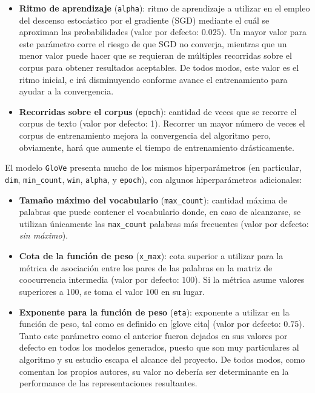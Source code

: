 \begin{itemize}
\item \textbf{Ritmo de aprendizaje} (\texttt{alpha}): ritmo de aprendizaje a utilizar en el empleo
del descenso estocástico por el gradiente (SGD) mediante el cuál se aproximan las probabilidades
(valor por defecto: $0.025$). Un mayor valor para este parámetro corre el riesgo de que SGD no
converja, mientras que un menor valor puede hacer que se requieran de múltiples recorridas sobre el
corpus para obtener resultados aceptables. De todos modos, este valor es el ritmo inicial, e irá
disminuyendo conforme avance el entrenamiento para ayudar a la convergencia.

\item \textbf{Recorridas sobre el corpus} (\texttt{epoch}): cantidad de veces que se recorre el
corpus de texto (valor por defecto: 1). Recorrer un mayor número de veces el corpus de entrenamiento
mejora la convergencia del algoritmo pero, obviamente, hará que aumente el tiempo de entrenamiento
drásticamente.

\end{itemize}

El modelo \texttt{GloVe} presenta mucho de los mismos hiperparámetros (en particular, \texttt{dim},
\texttt{min\_count}, \texttt{win}, \texttt{alpha}, y \texttt{epoch}), con algunos hiperparámetros
adicionales:

\begin{itemize}

\item \textbf{Tamaño máximo del vocabulario} (\texttt{max\_count}): cantidad máxima de palabras que
puede contener el vocabulario donde, en caso de alcanzarse, se utilizan únicamente las
\texttt{max\_count} palabras más frecuentes (valor por defecto: \textit{sin máximo}).

\item \textbf{Cota de la función de peso} (\texttt{x\_max}): cota superior a utilizar para la
métrica de asociación entre los pares de las palabras en la matriz de coocurrencia intermedia (valor
por defecto: $100$). Si la métrica asume valores superiores a $100$, se toma el valor $100$ en su
lugar.

\item \textbf{Exponente para la función de peso} (\texttt{eta}): exponente a utilizar en la función
de peso, tal como es definido en [glove cita] (valor por defecto: $0.75$). Tanto este parámetro como
el anterior fueron dejados en sus valores por defecto en todos los modelos generados, puesto que son
muy particulares al algoritmo y su estudio escapa el alcance del proyecto. De todos modos, como
comentan los propios autores, su valor no debería ser determinante en la performance de las
representaciones resultantes.

\end{itemize}

